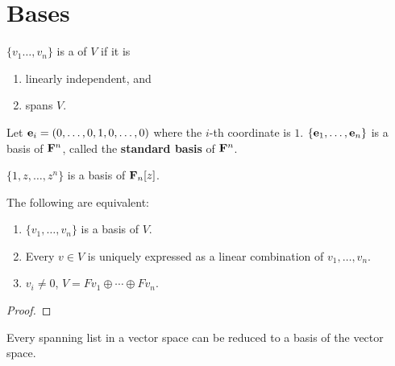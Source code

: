 \section{Bases}
\begin{definition}[Basis]
$\{v_1\dots,v_n\}$ is a  of $V$ if it is
\begin{enumerate}[label=(\roman*)]
\item linearly independent, and
\item spans $V$.
\end{enumerate}
\end{definition}

\begin{example}
Let $\vb{e}_i=(0,\dots,0,1,0,\dots,0)$ where the $i$-th coordinate is $1$. $\{\vb{e}_1,\dots,\vb{e}_n\}$ is a basis of $\mathbf F^n$, called the \textbf{standard basis} of $\mathbf F^n$.
\end{example}

\begin{example}
$\{1,z,\dots,z^n\}$ is a basis of $\mathbf F_n[z]$.
\end{example}

\begin{lemma}\label{lemma:basis-criterion}
The following are equivalent:
\begin{enumerate}[label=(\roman*)]
\item $\{v_1,\dots,v_n\}$ is a basis of $V$.
\item Every $v\in V$ is uniquely expressed as a linear combination of $v_1,\dots,v_n$.
\item $v_i\neq0$, $V=Fv_1\oplus\cdots\oplus Fv_n$.
\end{enumerate}
\end{lemma}

\begin{proof}

\end{proof}

\begin{lemma}\label{lemma:reduce-spanninglist-basis}
Every spanning list in a vector space can be reduced to a basis of the vector space.
\end{lemma}

